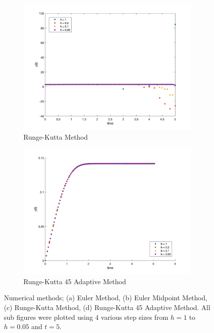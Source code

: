 \documentclass[12pt]{article}
\begin{document}
\begin{figure}[htp]
\begin{subfigure}{0.49\columnwidth}
\centering
\includegraphics[width=\textwidth]{rk_t_5.png}
\caption{Runge-Kutta Method}
\label{fig:time3}
\end{subfigure}\hfill
\begin{subfigure}{0.49\columnwidth}
\centering
\includegraphics[width=\textwidth]{rk_adapt_t_5.png}
\caption{Runge-Kutta 45 Adaptive Method}
\label{fig:time4}
\end{subfigure}

\caption{Numerical methods; (a) Euler Method, (b) Euler Midpoint Method, (c) Runge-Kutta Method, (d) Runge-Kutta 45 Adaptive Method. All sub figures were plotted using 4 various step sizes from $h = 1$ to $h = 0.05$ and $t = 5$.}
\label{fig:time}

\end{figure}
\end{document}
